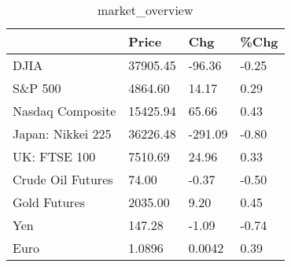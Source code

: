 \documentclass{article}%
\begin{document}
%


\begin{table}[htbp]%
\caption{market\_overview}%
\centering%
\begin{adjustbox}{width=1\textwidth}%
\begin{tabular}{llll}
\toprule
                  &    Price &     Chg &  \%Chg \\
\midrule
             DJIA & 37905.45 &  -96.36 & -0.25 \\
          S\&P 500 &  4864.60 &   14.17 &  0.29 \\
 Nasdaq Composite & 15425.94 &   65.66 &  0.43 \\
Japan: Nikkei 225 & 36226.48 & -291.09 & -0.80 \\
     UK: FTSE 100 &  7510.69 &   24.96 &  0.33 \\
Crude Oil Futures &    74.00 &   -0.37 & -0.50 \\
     Gold Futures &  2035.00 &    9.20 &  0.45 \\
              Yen &   147.28 &   -1.09 & -0.74 \\
             Euro &   1.0896 &  0.0042 &  0.39 \\
\bottomrule
\end{tabular}
%
\end{adjustbox}%
\end{table}

%
\end{document}
